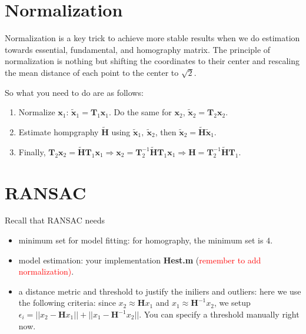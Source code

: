 \documentclass[a4paper]{article}
\begin{document}
\section{Normalization}
Normalization is a key trick to achieve more stable results when we do estimation towards essential, fundamental, and homography matrix. The principle of normalization is nothing but shifting the coordinates to their center and rescaling the mean distance of each point to the center to $\sqrt{2}$. 


So what you need to do are as follows:
\begin{enumerate}
	\item Normalize $\mathbf{x}_1$: $\tilde{\mathbf{x}}_1=\mathbf{T}_1\mathbf{x}_1$. Do the same for $\mathbf{x}_2$, $\tilde{\mathbf{x}}_2=\mathbf{T}_2\mathbf{x}_2$.
	\item Estimate hompgraphy $\tilde{\mathbf{H}}$ using $\tilde{\mathbf{x}}_1,\ \tilde{\mathbf{x}}_2$, then $\tilde{\mathbf{x}}_2=\tilde{\mathbf{H}}\tilde{\mathbf{x}}_1$.
	\item Finally, $\mathbf{T}_2\mathbf{x}_2=\tilde{\mathbf{H}}\mathbf{T}_1\mathbf{x}_1 \Rightarrow \mathbf{x}_2 = \mathbf{T}_2^{-1}\tilde{\mathbf{H}}\mathbf{T}_1\mathbf{x}_1 \Rightarrow
	\mathbf{H}=\mathbf{T}_2^{-1}\tilde{\mathbf{H}}\mathbf{T}_1$.
\end{enumerate}

\section{RANSAC}
Recall that RANSAC needs 
\begin{itemize}
	\item minimum set for model fitting: for homography, the minimum set is $4$.
	\item model estimation: your implementation \textbf{Hest.m} (\textcolor{red}{remember to add normalization)}.
	\item a distance metric and threshold to justify the iniliers and outliers: here we use the following criteria:
	since $x_2\approx \mathbf{H}x_1$ and $x_1\approx \mathbf{H}^{-1}x_2$, we setup $\epsilon_i=||x_2-\mathbf{H}x_1||+||x_1-\mathbf{H}^{-1}x_2||$. You can specify a threshold manually right now.
\end{itemize}
\end{document}

